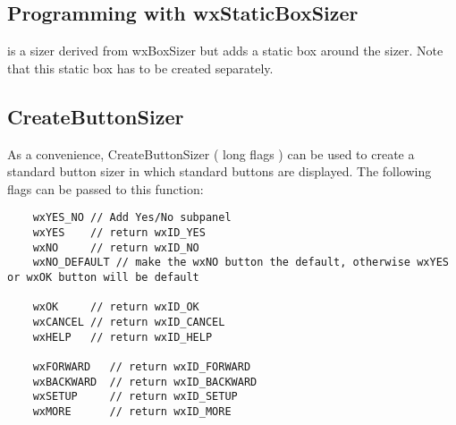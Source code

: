 \subsection{Programming with wxStaticBoxSizer}\label{staticboxsizerprogramming}

 is a sizer derived from wxBoxSizer but adds a static
box around the sizer. Note that this static box has to be created 
separately.

\subsection{CreateButtonSizer}\label{createbuttonsizer}

As a convenience, CreateButtonSizer ( long flags ) can be used to create a standard button sizer
in which standard buttons are displayed. The following flags can be passed to this function:


\begin{verbatim}
    wxYES_NO // Add Yes/No subpanel
    wxYES    // return wxID_YES
    wxNO     // return wxID_NO
    wxNO_DEFAULT // make the wxNO button the default, otherwise wxYES or wxOK button will be default
    
    wxOK     // return wxID_OK
    wxCANCEL // return wxID_CANCEL
    wxHELP   // return wxID_HELP
    
    wxFORWARD   // return wxID_FORWARD  
    wxBACKWARD  // return wxID_BACKWARD 
    wxSETUP     // return wxID_SETUP    
    wxMORE      // return wxID_MORE     

\end{verbatim}
